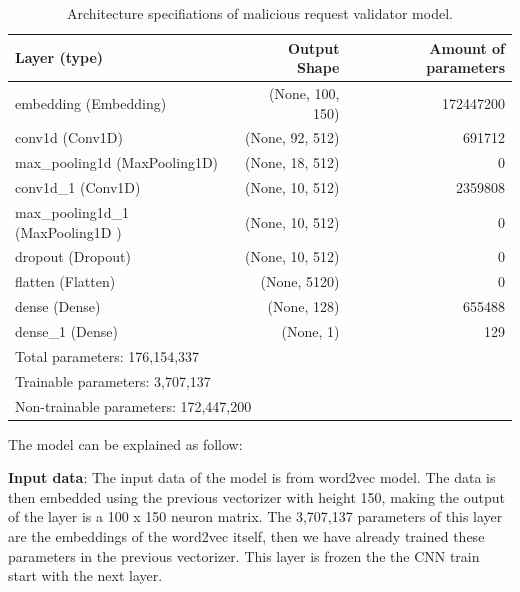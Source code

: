 \begin{table}[!h]
	\begin{tabular}{lrr}
	\hline
	\textbf{Layer (type)}             & \textbf{Output Shape} & \textbf{Amount of parameters} \\ \hline
	embedding (Embedding)             & (None, 100, 150)      & 172447200                     \\
	conv1d (Conv1D)                   & (None, 92, 512)       & 691712                        \\
	max\_pooling1d (MaxPooling1D)     & (None, 18, 512)       & 0                             \\
	conv1d\_1 (Conv1D)                & (None, 10, 512)       & 2359808                       \\
	max\_pooling1d\_1 (MaxPooling1D ) & (None, 10, 512)       & 0                             \\
	dropout (Dropout)                 & (None, 10, 512)       & 0                             \\
	flatten (Flatten)                 & (None, 5120)          & 0                             \\
	dense (Dense)                     & (None, 128)           & 655488                        \\
	dense\_1 (Dense)                  & (None, 1)             & 129                           \\ \hline
	\multicolumn{3}{l}{Total parameters: 176,154,337}                                         \\
	\multicolumn{3}{l}{Trainable parameters: 3,707,137}                                       \\
	\multicolumn{3}{l}{Non-trainable parameters: 172,447,200}                                 \\ \hline
	\end{tabular}
	\caption{\label{demo-table} Architecture specifiations of malicious request validator model.}
\end{table}



The model can be explained as follow: 

\textbf{Input data}: The input data of the model is from word2vec model. The data is then embedded using the previous vectorizer with height 150, making the output of the layer is a 100 x 150 neuron matrix. The 3,707,137 parameters of this layer are the embeddings of the word2vec itself, then we have already trained these parameters in the previous vectorizer. This layer is frozen the the CNN train start with the next layer. 

